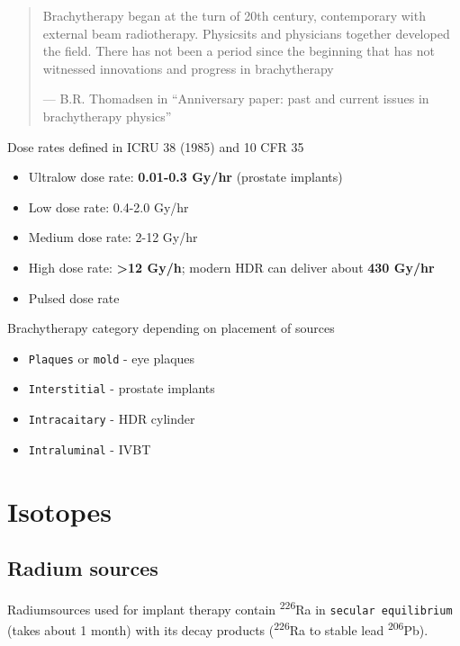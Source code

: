 \documentclass[]{book}
\providecommand{\tightlist}{%
  \setlength{\itemsep}{0pt}\setlength{\parskip}{0pt}}
\theoremstyle{definition}
\theoremstyle{definition}
\theoremstyle{definition}
\theoremstyle{remark}
\begin{document}
\begin{quote}
Brachytherapy began at the turn of 20th century, contemporary with
external beam radiotherapy. Physicsits and physicians together developed
the field. There has not been a period since the beginning that has not
witnessed innovations and progress in brachytherapy

--- B.R. Thomadsen in ``Anniversary paper: past and current issues in
brachytherapy physics''
\end{quote}

Dose rates defined in ICRU 38 (1985) and 10 CFR 35

\begin{itemize}
\tightlist
\item
  Ultralow dose rate: \textbf{0.01-0.3 Gy/hr} (prostate implants)
\item
  Low dose rate: 0.4-2.0 Gy/hr
\item
  Medium dose rate: 2-12 Gy/hr
\item
  High dose rate: \textbf{\textgreater{}12 Gy/h}; modern HDR can deliver
  about \textbf{430 Gy/hr}
\item
  Pulsed dose rate
\end{itemize}

Brachytherapy category depending on placement of sources

\begin{itemize}
\tightlist
\item
  \texttt{Plaques} or \texttt{mold} - eye plaques
\item
  \texttt{Interstitial} - prostate implants
\item
  \texttt{Intracaitary} - HDR cylinder
\item
  \texttt{Intraluminal} - IVBT
\end{itemize}

\section{Isotopes}\label{isotopes}

\subsection{Radium sources}\label{radium-sources}

Radiumsources used for implant therapy contain \textsuperscript{226}Ra
in \texttt{secular\ equilibrium} (takes about 1 month) with its decay
products (\textsuperscript{226}Ra to stable lead
\textsuperscript{206}Pb).
\end{document}
